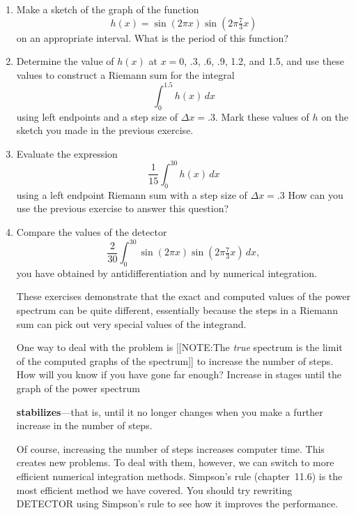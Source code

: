\begin{enumerate}
The program POWER calculates the spectrum numerically.  In particular,
we used it to calculate
	\[
\int_0^{30} \sin(2\pi x) 
	\sin\left(2\pi \tfrac{7}{3} x\right)\, dx,
\]
with 100 steps.  The step size is therefore $\Delta x = .3$.  In the
following exercises you will duplicate this numerical work ``by
hand.''



\item Make a sketch of the graph of the function
	\[
h(x) = \sin(2\pi x) \sin\left(2\pi \tfrac{7}{3} x \right)
\]
on an appropriate interval.  What is the period of this function?


\item Determine the value of $h(x)$ at $x = 0$, .3, .6, .9, 1.2, and
1.5, and use these values to construct a Riemann sum for the integral
	\[
\int_0^{1.5} h(x) \, dx
\]
using left endpoints and a step size of $\Delta x = .3$.  Mark these
values of $h$ on the sketch you made in the previous exercise.




\item Evaluate the expression
\[
\dfrac{1}{15}\int_0^{30} h(x) \, dx
\]
using a left endpoint Riemann sum with a step size of $\Delta x = .3$
How can you use the previous exercise to answer this question?



\item Compare the values of the detector
	\[
\dfrac{2}{30}\int_0^{30} \sin(2\pi x) 
	\sin\left(2\pi \tfrac{7}{3} x\right)\, dx,
\]
you have obtained by antidifferentiation and by numerical integration.




These exercises demonstrate that the exact and computed values of the
power spectrum can be quite different, essentially because the steps
in a Riemann sum can pick out very special values of the integrand.

One way to deal with the problem is 
[[NOTE:The {\em true\/} spectrum  is the limit of the computed graphs  of the spectrum]]	
to increase the number of steps.  How will you know if you have gone
far enough?  Increase in stages until the graph of the power spectrum

{\bf stabilizes}---that is, until it no longer changes when you make a
further increase in the number of steps.

Of course, increasing the number of steps increases computer time.
This creates new problems.  To deal with them, however, we can switch
to more efficient numerical integration methods.  Simpson's rule
(chapter~11.6) is the most efficient method we have covered.  You
should try rewriting DETECTOR using Simpson's rule to see how it
improves the performance.




\end{enumerate}
